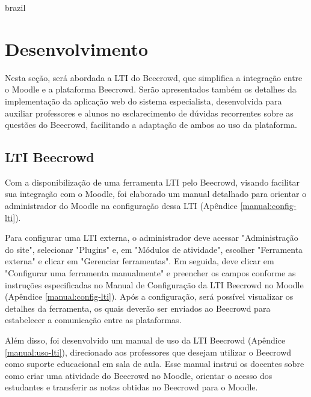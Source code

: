 

\begin{otherlanguage*}{brazil}

\chapter{Desenvolvimento}

Nesta seção, será abordada a LTI do Beecrowd, que simplifica a integração entre o Moodle e a plataforma Beecrowd. Serão apresentados também os detalhes da implementação da aplicação web do sistema especialista, desenvolvida para auxiliar professores e alunos no esclarecimento de dúvidas recorrentes sobre as questões do Beecrowd, facilitando a adaptação de ambos ao uso da plataforma.

\section{LTI Beecrowd}

Com a disponibilização de uma ferramenta LTI pelo Beecrowd, visando facilitar sua integração com o Moodle, foi elaborado um manual detalhado para orientar o administrador do Moodle na configuração dessa LTI (Apêndice \ref{manual:config-lti}).

Para configurar uma LTI externa, o administrador deve acessar "Administração do site", selecionar "Plugins" e, em "Módulos de atividade", escolher "Ferramenta externa" e clicar em "Gerenciar ferramentas". Em seguida, deve clicar em "Configurar uma ferramenta manualmente" e preencher os campos conforme as instruções especificadas no Manual de Configuração da LTI Beecrowd no Moodle (Apêndice \ref{manual:config-lti}). Após a configuração, será possível visualizar os detalhes da ferramenta, os quais deverão ser enviados ao Beecrowd para estabelecer a comunicação entre as plataformas.

Além disso, foi desenvolvido um manual de uso da LTI Beecrowd (Apêndice \ref{manual:uso-lti}), direcionado aos professores que desejam utilizar o Beecrowd como suporte educacional em sala de aula. Esse manual instrui os docentes sobre como criar uma atividade do Beecrowd no Moodle, orientar o acesso dos estudantes e transferir as notas obtidas no Beecrowd para o Moodle.


\end{otherlanguage*}
